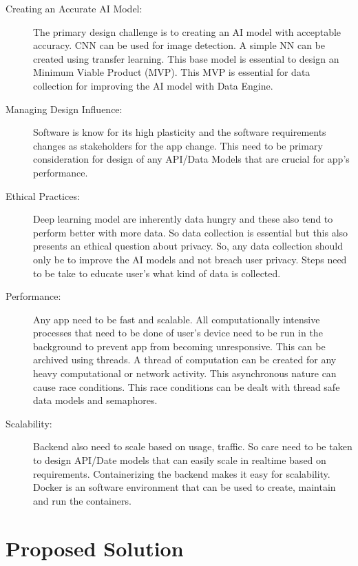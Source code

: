 \documentclass[../Report.tex]{subfiles}
\begin{document}
\begin{description}
    \item[Creating an Accurate AI Model:] The primary design challenge is to creating an AI model with acceptable accuracy. CNN\cite{cnn}
    can be used for image detection. A simple NN can be created using transfer learning. This base model is essential to design an 
    Minimum Viable Product (MVP). This MVP is essential for data collection for improving the AI model with Data Engine.
    
    \item[Managing Design Influence:] Software is know for its high plasticity and the software requirements changes as stakeholders for
    the app change. This need to be primary consideration for design of any API/Data Models that are crucial for app's performance.

    \item[Ethical Practices:] Deep learning model are inherently data hungry and these also tend to perform better with more data. So
    data collection is essential but this also presents an ethical question about privacy. So, any data collection should only be to 
    improve the AI models and not breach user privacy. Steps need to be take to educate user's what kind of data is collected.

    \item[Performance:] Any app need to be fast and scalable. All computationally intensive processes that need to be 
    done of user's device need to be run in the background to prevent app from becoming unresponsive. This can be archived using 
    threads. A thread of computation can be created for any heavy computational or network activity. This asynchronous nature can 
    cause race conditions. This race conditions can be dealt with thread safe data models and semaphores.
    
    \item[Scalability:] Backend also need to scale based on usage, traffic. So care need to be taken to design API/Date models that 
    can easily scale in realtime based on requirements. Containerizing the backend makes it easy for scalability. Docker is an software 
    environment that can be used to create, maintain and run the containers.
\end{description}

\section{Proposed Solution}
\end{document}
